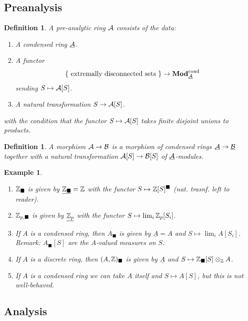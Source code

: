 \documentclass[A4paper, british, reqno]{amsart}
\theoremstyle{darkgreentheorem}
\theoremstyle{darkbluedefinition}
\newtheorem{defn}[thm]{Definition}
\theoremstyle{darkredexample}
\newtheorem{exa}[thm]{Example}
\theoremstyle{remark}
\newcommand{\1}{\mathbbm{1}}
\renewcommand{\u}[1]{\underline{#1}}
\newcommand{\ot}{\otimes}
\newcommand{\solid}{^{\blacksquare}}
\newcommand{\usolid}{_{\blacksquare}}
\begin{document}
\subsection{Preanalysis}

\begin{defn}
    A \textit{pre-analytic ring} $\mathcal{A}$ consists of the data:
    \begin{enumerate}[label=\roman*)]
	\item A condensed ring $\u{\calA}$.
	\item A functor
	    \[ \{ \text{ extremally disconnected sets }\}\to \Mod_{\u{\calA}}^{\text{cond}} \]
	    sending $S\mapsto \mathcal{A}[S]$.
	\item A natural transformation $S\to \mathcal{A}[S]$.
    \end{enumerate}
    with the condition that the functor $S\mapsto \mathcal{A}[S]$ takes finite disjoint unions to products.
\end{defn}

\begin{defn}
    A morphism $\mathcal{A}\to \mathcal{B}$ is a morphism of condensed rings $\u{\calA}\to \u{\calB}$ together with a natural transformation $\mathcal{A}[S]\to \mathcal{B}[S]$ of $\u{\calA}$-modules.
\end{defn}

\begin{exa}
    \begin{enumerate}[label=\roman*)]
	\item $\Z\usolid$ is given by $\u{\Z\usolid}=\Z$ with the functor $S\mapsto \Z[S]\solid$ (nat. trasnf. left to reader).
	\item $\mathbb{Z}_{p,\blacksquare}$ is given by $\u{\Z_{p}}$ with the functor $S\mapsto \lim_{i}\mathbb{Z}_{p}[S_{i}]$.
	\item If $A$ is a condensed ring, then $A\usolid$ is given by $\u{A}=A$ and $S\mapsto \lim_{i}A[S_{i}]$.
	    Remark: $A\usolid[S]$ are the $A$-valued measures on $S$.
	\item If $A$ is a discrete ring, then $(A,\Z)\usolid$ is given by $\u{A}$ and $S\mapsto \Z\usolid[S]\ot_{\Z}A$.
	\item If $A$ is a condensed ring we can take $A$ itself and $S\mapsto A[S]$, but this is not well-behaved.
    \end{enumerate}
\end{exa}

\subsection{Analysis}
\end{document}
